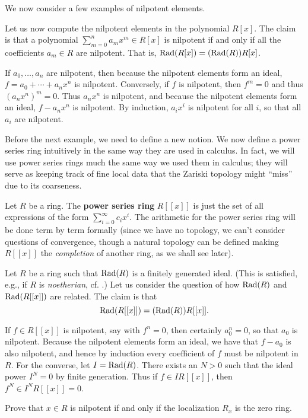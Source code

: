 We now consider a few examples of nilpotent elements.
\begin{example}
Let us now compute the nilpotent elements in the polynomial $R[x]$.
The claim is that a polynomial $\sum_{m=0}^n a_m x^m \in R[x]$ is nilpotent if
and only
if all the coefficients $a_m \in R$ are nilpotent. That is, $\operatorname{Rad}(R[x]) =
(\operatorname{Rad}(R))R[x]$.

If $a_0,\ldots,a_n$ are nilpotent, then because the nilpotent
elements form an ideal, $f=a_0+\cdots+a_nx^n$ is nilpotent. Conversely,
if $f$ is nilpotent, then $f^m=0$ and thus $(a_nx^n)^m=0$. Thus $a_nx^n$
is nilpotent, and because the nilpotent elements form an ideal, $f-a_nx^n$
is nilpotent. By induction, $a_ix^i$ is nilpotent for all $i$, so that all
$a_i$ are nilpotent.
\end{example} 

Before the next example, we need to define a new notion.
We now define a power series ring intuitively in the same way they are used in
calculus. In fact, we will use power series rings much the same way we used them
in calculus; they will serve as keeping track of fine local data that the
Zariski topology might ``miss'' due to its coarseness.
\begin{definition} \label{powerseriesring} Let $R$ be a ring. The \textbf{power series ring} $R[[x]]$ is just the set of all
expressions of the form $\sum_{i=0}^\infty c_i x^i$. The arithmetic for the
power series ring will be done term by term formally (since we have no topology,
we can't consider questions of convergence, though a natural topology can be
defined making $R[[x]]$ the \emph{completion} of another ring, as we shall
see later). \end{definition}




\begin{example}
Let $R$ be  a ring such that $\operatorname{Rad}(R)$ is a finitely generated ideal. (This is
satisfied, e.g., if $R$ is \emph{noetherian}, cf. .)
Let us consider the question of how $\operatorname{Rad}(R)$ and $\operatorname{Rad}(R[[x]])$ are related.
The claim is that
\[ \operatorname{Rad}(R[[x]]) = (\operatorname{Rad}(R))R[[x]].  \]

If $f\in R[[x]]$ is nilpotent, say with $f^n=0$, then
certainly $a_0^n=0$, so that $a_0$ is nilpotent. Because the nilpotent elements
form an ideal, we have that $f-a_0$ is also nilpotent, and hence by induction
every coefficient of $f$ must be nilpotent in $R$. 
For the converse, let $I =
\operatorname{Rad}(R)$. There
exists an $N>0$ such that the ideal power $I^N  = 0$ by finite generation. 
Thus if $f \in IR[[x]]$, then $f^N \in I^N R[[x]] = 0$.
\end{example} 
\begin{exercise} \label{nilpcriterion} 
Prove that $x \in R$ is nilpotent if and only if the localization $R_x$ is the
zero ring.
\end{exercise} 

